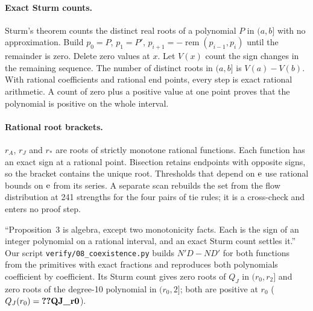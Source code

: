 \paragraph{Exact Sturm counts.} Sturm's theorem counts the distinct real roots of a polynomial \(P\) in \((a,b]\) with no
approximation. Build \(p_0=P\), \(p_1=P'\), \(p_{i+1}=-\operatorname{rem}(p_{i-1},p_i)\) until the remainder is zero. Delete zero values at \(x\).
Let \(V(x)\) count the sign changes in the remaining sequence. The number of distinct roots in \((a,b]\) is
\(V(a)-V(b)\). With rational coefficients and rational end points, every step is exact rational arithmetic. A count of
zero plus a positive value at one point proves that the polynomial is positive on the whole interval.

\paragraph{Rational root brackets.} \(r_A\), \(r_J\) and \(r_*\) are roots of strictly monotone rational functions.
Each function has an exact sign at a rational point.
Bisection retains endpoints with opposite signs, so the bracket contains the unique root. Thresholds that depend on \(\mathrm{e}\) use rational bounds on
\(\mathrm{e}\) from its series. A separate scan rebuilds the set from the flow distribution at 241 strengths for the four pairs of tie
rules; it is a cross-check and enters no proof step.

\begin{panelnote}
``Proposition~3 is algebra, except two monotonicity facts. Each is the sign of an integer polynomial on a rational
interval, and an exact Sturm count settles it.'' Our script \texttt{verify/08\_coexistence.py} builds \(N'D-ND'\) for both
functions from the primitives with exact fractions and reproduces both polynomials coefficient by coefficient. Its Sturm
count gives zero roots of \(Q_J\) in \((r_0,r_2]\) and zero roots of the degree-10 polynomial in \((r_0,2]\); both are
positive at \(r_0\) (\(Q_J(r_0)=\reg{QJ_r0}\)).
\end{panelnote}

